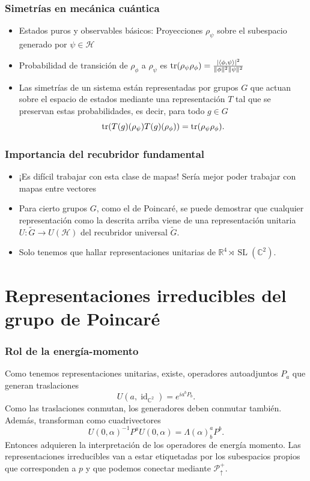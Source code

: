 \documentclass{beamer}
\DeclareMathOperator{\SL}{SL}
\DeclareMathOperator{\id}{id}
\begin{document}
\begin{frame}
\frametitle{Simetrías en mecánica cuántica}
\begin{itemize}
\item Estados puros y observables básicos: Proyecciones $\rho_\psi$ sobre el subespacio generado por $\psi\in\mathcal{H}$
\item Probabilidad de transición de $\rho_\phi$ a $\rho_\psi$ es $\tr(\rho_\psi\rho_\phi)=\frac{|\langle\phi,\psi\rangle|^2}{\|\phi\|^2\|\psi\|^2}$
\item Las simetrías de un sistema están representadas por grupos $G$ que actuan sobre el espacio de estados mediante una representación $T$ tal que se preservan estas probabilidades, es decir, para todo $g\in G$
\begin{equation}
\tr(T(g)(\rho_\psi)T(g)(\rho_\phi))=\tr(\rho_\psi\rho_\phi).
\end{equation} 
\end{itemize}
\end{frame}

\begin{frame}
\frametitle{Importancia del recubridor fundamental}
\begin{itemize}
\item ¡Es difícil trabajar con esta clase de mapas! Sería mejor poder trabajar con mapas entre vectores
\item Para cierto grupos $G$, como el de Poincaré, se puede demostrar que cualquier representación como la descrita arriba viene de una representación unitaria $U:\tilde{G}\rightarrow U(\mathcal{H})$ del recubridor universal $\tilde{G}$.
\item Solo tenemos que hallar representaciones unitarias de $\mathbb{R}^4\rtimes\SL(\mathbb{C}^2)$.
\end{itemize}
\end{frame}

\section{Representaciones irreducibles del grupo de Poincaré}

\begin{frame}
\frametitle{Rol de la energía-momento}
Como tenemos representaciones unitarias, existe, operadores autoadjuntos $P_a$ que generan traslaciones
\begin{equation}
U(a,\id_{\mathbb{C}^2})=e^{ia^bP_b}.
\end{equation}
Como las traslaciones conmutan, los generadores deben conmutar también. Además, transforman como cuadrivectores
\begin{equation}
U(0,\alpha)^{-1}P^a U(0,\alpha) = \Lambda(\alpha)^a_b P^b.
\end{equation}
Entonces adquieren la interpretación de los operadores de energía momento. Las representaciones irreducibles van a estar etiquetadas por los subespacios propios que corresponden a $p$ y que podemos conectar mediante $\mathcal{P}^+_\uparrow$.
\end{frame}
\end{document}
